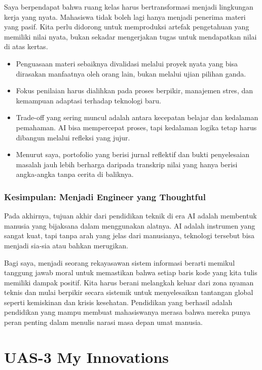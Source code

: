 \documentclass[
  letterpaper,
  DIV=11,
  numbers=noendperiod]{scrreprt}
\begin{document}
Saya berpendapat bahwa ruang kelas harus bertransformasi menjadi
lingkungan kerja yang nyata. Mahasiswa tidak boleh lagi hanya menjadi
penerima materi yang pasif. Kita perlu didorong untuk memproduksi
artefak pengetahuan yang memiliki nilai nyata, bukan sekadar mengerjakan
tugas untuk mendapatkan nilai di atas kertas.

\begin{itemize}
\item
  Penguasaan materi sebaiknya divalidasi melalui proyek nyata yang bisa
  dirasakan manfaatnya oleh orang lain, bukan melalui ujian pilihan
  ganda.
\item
  Fokus penilaian harus dialihkan pada proses berpikir, manajemen stres,
  dan kemampuan adaptasi terhadap teknologi baru.
\item
  Trade-off yang sering muncul adalah antara kecepatan belajar dan
  kedalaman pemahaman. AI bisa mempercepat proses, tapi kedalaman logika
  tetap harus dibangun melalui refleksi yang jujur.
\item
  Menurut saya, portofolio yang berisi jurnal reflektif dan bukti
  penyelesaian masalah jauh lebih berharga daripada transkrip nilai yang
  hanya berisi angka-angka tanpa cerita di baliknya.
\end{itemize}

\subsection{Kesimpulan: Menjadi Engineer yang
Thoughtful}\label{kesimpulan-menjadi-engineer-yang-thoughtful}

Pada akhirnya, tujuan akhir dari pendidikan teknik di era AI adalah
membentuk manusia yang bijaksana dalam menggunakan alatnya. AI adalah
instrumen yang sangat kuat, tapi tanpa arah yang jelas dari manusianya,
teknologi tersebut bisa menjadi sia-sia atau bahkan merugikan.

Bagi saya, menjadi seorang rekayasawan sistem informasi berarti memikul
tanggung jawab moral untuk memastikan bahwa setiap baris kode yang kita
tulis memiliki dampak positif. Kita harus berani melangkah keluar dari
zona nyaman teknis dan mulai berpikir secara sistemik untuk
menyelesaikan tantangan global seperti kemiskinan dan krisis kesehatan.
Pendidikan yang berhasil adalah pendidikan yang mampu membuat
mahasiswanya merasa bahwa mereka punya peran penting dalam menulis
narasi masa depan umat manusia.


\chapter{UAS-3 My Innovations}\label{uas-3-my-innovations}
\end{document}
